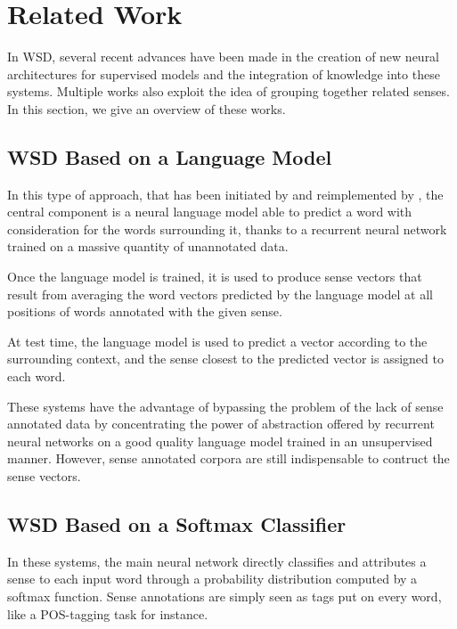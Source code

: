 \documentclass[11pt]{article}
\newcommand{\citet}[1]{\newcite{#1}}
\begin{document}
\section{Related Work}

In WSD, several recent advances have been made in the creation of new neural architectures for supervised models and the integration of knowledge into these systems. Multiple works also exploit the idea of grouping together related senses. In this section, we give an overview of these works.



\subsection{WSD Based on a Language Model}

In this type of approach, that has been initiated by \citet{yuan_2016} and reimplemented by \citet{minh2018}, the central component is a neural language model able to predict a word with consideration for the words surrounding it, thanks to a recurrent neural network trained on a massive quantity of unannotated data.

Once the language model is trained, it is used to produce sense vectors that result from averaging the word vectors predicted by the language model at all positions of words annotated with the given sense.

At test time, the language model is used to predict a vector according to the surrounding context, and the sense closest to the predicted vector is assigned to each word.

These systems have the advantage of bypassing the problem of the lack of sense annotated data by concentrating the power of abstraction offered by recurrent neural networks on a good quality language model trained in an unsupervised manner.
However, sense annotated corpora are still indispensable to contruct the sense vectors.


\subsection{WSD Based on a Softmax Classifier}\label{sec:classif_based_wsd}

In these systems, the main neural network directly classifies and attributes a sense to each input word through a probability distribution computed by a softmax function. Sense annotations are simply seen as tags put on every word, like a POS-tagging task for instance.
\end{document}
